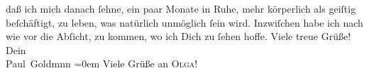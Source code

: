 \begin{ledgroupsized}[t]{13cm}
               daß ich mich danach ſehne, ein paar Monate in Ruhe, mehr körperlich als geiſtig
               beſchäftigt, zu leben, was natürlich unmöglich ſein wird. Inzwiſchen habe ich {\pb}nach wie vor die Abſicht, \label{K_L03210-2v}\label{K_L03210-2h} zu kommen, wo ich
               Dich zu ſehen hoffe.\pend
           \pstart
           Viele treue Grüße! {\\[\baselineskip]}Dein {\\[\baselineskip]}\spacefill\mbox{Paul Goldmnn}\pend
           \leftskip=0em{}\pstart
           \noindent{}Viele Grüße an \textsc{Olga}!\pend
           
         
         \endnumbering{}\end{ledgroupsized}  \newcommand{\dateiname}{L03210}\newcommand{\titel}{Paul Goldmann an Arthur Schnitzler, 9. 6. [1902]}\newcommand{\editorInnen}{Martin Anton Müller und Laura Untner}
      